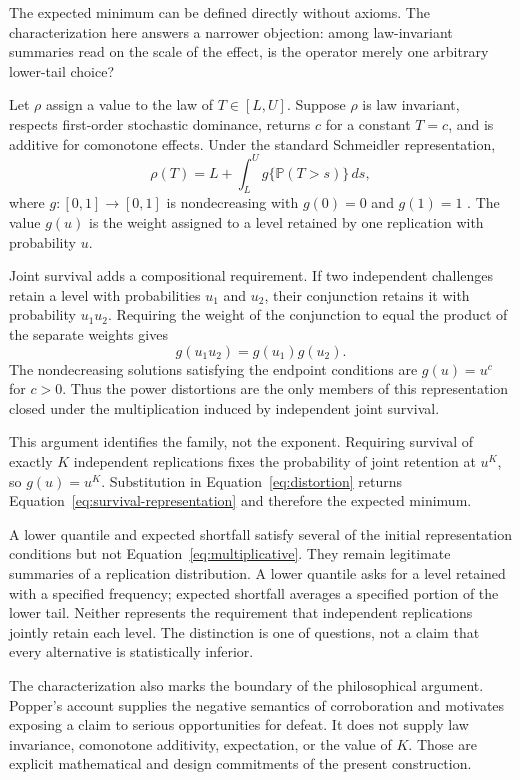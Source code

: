 \documentclass[11pt]{article}
\newcommand{\Prb}{\mathbb{P}}
\theoremstyle{remark}
\begin{document}
The expected minimum can be defined directly without axioms. The characterization here answers a narrower objection: among law-invariant summaries read on the scale of the effect, is the operator merely one arbitrary lower-tail choice?

Let $\rho$ assign a value to the law of $T\in[L,U]$. Suppose $\rho$ is law invariant, respects first-order stochastic dominance, returns $c$ for a constant $T=c$, and is additive for comonotone effects. Under the standard Schmeidler representation,
\begin{equation}
\rho(T)
=
L+\int_L^U
g\{\Prb(T>s)\}\,ds,
\label{eq:distortion}
\end{equation}
where $g:[0,1]\to[0,1]$ is nondecreasing with $g(0)=0$ and $g(1)=1$ \cite{schmeidler1986integral,yaari1987dual}. The value $g(u)$ is the weight assigned to a level retained by one replication with probability $u$.

Joint survival adds a compositional requirement. If two independent challenges retain a level with probabilities $u_1$ and $u_2$, their conjunction retains it with probability $u_1u_2$. Requiring the weight of the conjunction to equal the product of the separate weights gives
\begin{equation}
g(u_1u_2)=g(u_1)g(u_2).
\label{eq:multiplicative}
\end{equation}
The nondecreasing solutions satisfying the endpoint conditions are $g(u)=u^c$ for $c>0$. Thus the power distortions are the only members of this representation closed under the multiplication induced by independent joint survival.

This argument identifies the family, not the exponent. Requiring survival of exactly $K$ independent replications fixes the probability of joint retention at $u^K$, so $g(u)=u^K$. Substitution in Equation~\eqref{eq:distortion} returns Equation~\eqref{eq:survival-representation} and therefore the expected minimum.

A lower quantile and expected shortfall satisfy several of the initial representation conditions but not Equation~\eqref{eq:multiplicative}. They remain legitimate summaries of a replication distribution. A lower quantile asks for a level retained with a specified frequency; expected shortfall averages a specified portion of the lower tail. Neither represents the requirement that independent replications jointly retain each level. The distinction is one of questions, not a claim that every alternative is statistically inferior.

The characterization also marks the boundary of the philosophical argument. Popper's account supplies the negative semantics of corroboration and motivates exposing a claim to serious opportunities for defeat. It does not supply law invariance, comonotone additivity, expectation, or the value of $K$. Those are explicit mathematical and design commitments of the present construction.
\end{document}
